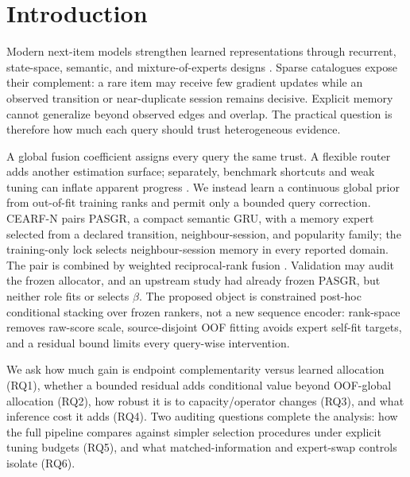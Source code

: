 \documentclass[runningheads]{llncs}
\newcommand{\method}{CEARF-N}
\begin{document}
\section{Introduction}
Modern next-item models strengthen learned representations through recurrent,
state-space, semantic, and mixture-of-experts designs
\cite{li2025survey,sigma2025,hm2rec2026,llm2rec2025,hidlongtail2026}. Sparse
catalogues expose their complement: a rare item may receive few gradient
updates while an observed transition or near-duplicate session remains
decisive. Explicit memory cannot generalize beyond observed edges and overlap.
The practical question is therefore how much each query should trust
heterogeneous evidence.

A global fusion coefficient assigns every query the same trust. A flexible
router adds another estimation surface; separately, benchmark shortcuts and
weak tuning can inflate apparent progress
\cite{shortcut2026,standards2026}. We
instead learn a continuous global prior from out-of-fit training ranks and
permit only a bounded query correction. \method{} pairs PASGR, a compact
semantic GRU, with a memory expert selected from a declared transition,
neighbour-session, and popularity family; the training-only lock selects
neighbour-session memory in every reported domain. The pair is combined by
weighted reciprocal-rank fusion \cite{cormack2009rrf}. Validation may audit
the frozen allocator, and an upstream study had already frozen PASGR, but
neither role fits or selects $\beta$. The proposed object is constrained
post-hoc conditional stacking over frozen rankers, not a new sequence encoder:
rank-space removes raw-score scale, source-disjoint OOF fitting avoids expert
self-fit targets, and a residual bound limits every query-wise intervention.

We ask how much gain is endpoint complementarity versus learned allocation
(RQ1), whether a bounded residual adds conditional value beyond OOF-global
allocation (RQ2), how robust it is to capacity/operator changes (RQ3), and
what inference cost it adds (RQ4). Two auditing questions complete the
analysis: how the full pipeline compares against simpler selection
procedures under explicit tuning budgets (RQ5), and what matched-information
and expert-swap controls isolate (RQ6).
\end{document}
